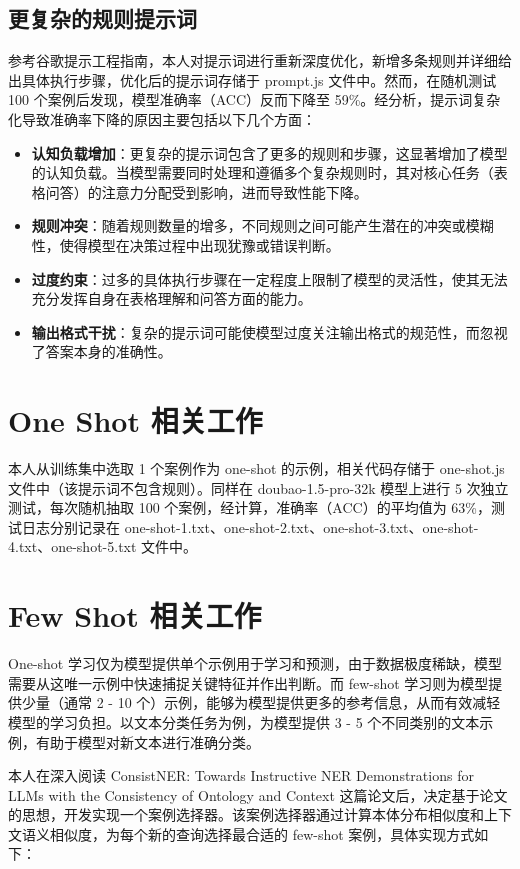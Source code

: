 \documentclass[10.5pt,compsoc]{CjC}
\theoremstyle{mystyle}
\begin{document}
\begin{CJK*}{UTF8}{zhhei}
\subsection{更复杂的规则提示词}
参考谷歌提示工程指南，本人对提示词进行重新深度优化，新增多条规则并详细给出具体执行步骤，优化后的提示词存储于 prompt.js 文件中。然而，在随机测试 100 个案例后发现，模型准确率（ACC）反而下降至 59\%。经分析，提示词复杂化导致准确率下降的原因主要包括以下几个方面：

\begin{itemize}
  \item \textbf{认知负载增加}：更复杂的提示词包含了更多的规则和步骤，这显著增加了模型的认知负载。当模型需要同时处理和遵循多个复杂规则时，其对核心任务（表格问答）的注意力分配受到影响，进而导致性能下降。
  \item \textbf{规则冲突}：随着规则数量的增多，不同规则之间可能产生潜在的冲突或模糊性，使得模型在决策过程中出现犹豫或错误判断。
  \item \textbf{过度约束}：过多的具体执行步骤在一定程度上限制了模型的灵活性，使其无法充分发挥自身在表格理解和问答方面的能力。
  \item \textbf{输出格式干扰}：复杂的提示词可能使模型过度关注输出格式的规范性，而忽视了答案本身的准确性。
\end{itemize}

\section{One Shot 相关工作}
本人从训练集中选取 1 个案例作为 one-shot 的示例，相关代码存储于 one-shot.js 文件中（该提示词不包含规则）。同样在 doubao-1.5-pro-32k 模型上进行 5 次独立测试，每次随机抽取 100 个案例，经计算，准确率（ACC）的平均值为 63\%，测试日志分别记录在 one-shot-1.txt、one-shot-2.txt、one-shot-3.txt、one-shot-4.txt、one-shot-5.txt 文件中。

\section{Few Shot 相关工作}
One-shot 学习仅为模型提供单个示例用于学习和预测，由于数据极度稀缺，模型需要从这唯一示例中快速捕捉关键特征并作出判断。而 few-shot 学习则为模型提供少量（通常 2 - 10 个）示例，能够为模型提供更多的参考信息，从而有效减轻模型的学习负担。以文本分类任务为例，为模型提供 3 - 5 个不同类别的文本示例，有助于模型对新文本进行准确分类。

本人在深入阅读 ConsistNER: Towards Instructive NER Demonstrations for LLMs with the Consistency of Ontology and Context 这篇论文后，决定基于论文的思想，开发实现一个案例选择器。该案例选择器通过计算本体分布相似度和上下文语义相似度，为每个新的查询选择最合适的 few-shot 案例，具体实现方式如下：


\end{CJK*}
\end{document}
